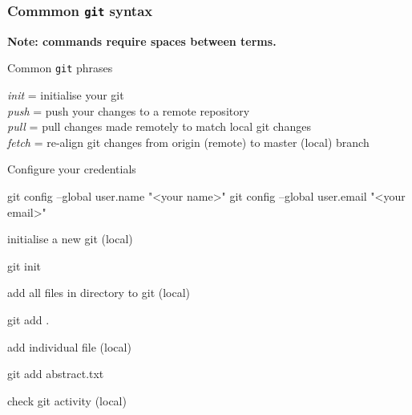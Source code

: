 \documentclass[10,portrait]{article}
\newenvironment{Shaded}{\begin{snugshade}}{\end{snugshade}}
\newcommand{\StringTok}[1]{\textcolor[rgb]{0.31,0.60,0.02}{#1}}
\newcommand{\FunctionTok}[1]{\textcolor[rgb]{0.00,0.00,0.00}{#1}}
\newcommand{\NormalTok}[1]{#1}
\begin{document}
\subsubsection{\texorpdfstring{Commmon \texttt{git}
syntax}{Commmon git syntax}}\label{commmon-git-syntax}

\textbf{Note: commands require spaces between terms.}

Common \texttt{git} phrases

\emph{init} = initialise your git\\
\emph{push} = push your changes to a remote repository\\
\emph{pull} = pull changes made remotely to match local git changes\\
\emph{fetch} = re-align git changes from origin (remote) to master
(local) branch

Configure your credentials

\begin{Shaded}
\begin{Highlighting}[]
\FunctionTok{git}\NormalTok{ config --global user.name }\StringTok{"<your name>"}
\FunctionTok{git}\NormalTok{ config --global user.email }\StringTok{"<your email>"}  
\end{Highlighting}
\end{Shaded}

initialise a new git (local)

\begin{Shaded}
\begin{Highlighting}[]
\FunctionTok{git}\NormalTok{ init  }
\end{Highlighting}
\end{Shaded}

add all files in directory to git (local)

\begin{Shaded}
\begin{Highlighting}[]
\FunctionTok{git}\NormalTok{ add .}
\end{Highlighting}
\end{Shaded}

add individual file (local)

\begin{Shaded}
\begin{Highlighting}[]
\FunctionTok{git}\NormalTok{ add abstract.txt}
\end{Highlighting}
\end{Shaded}

check git activity (local)
\end{document}
